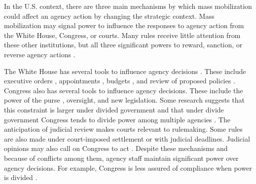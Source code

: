 In the U.S. context, there are three main mechanisms by which mass mobilization could affect an agency action by changing the strategic context. 
Mass mobilization may signal power to influence the responses to agency action from the White House, Congress, or courts. Many rules receive little attention from these other institutions, but all three significant powers to reward, sanction, or reverse agency actions \citep{Yaver2016}. 

% 


The White House has several tools to influence agency decisions \citep{Yackee2009a,Simon1954}. These include executive orders \citep{Mayer1999}, appointments \citep{Doherty2014,Lewis2008,Wood1988}, budgets \citep{Whittington2003}, and review of proposed policies \citep{HAEDER2015InfluenceBudget,Acs2013}. 
Congress also has several tools to influence agency decisions. These include the power of the purse \citep{Fenno1986,Bolton2015}, oversight, and new legislation. Some research suggests that this constraint is larger under divided government \citep{Yackee2009b} and that under divide government Congress tends to divide power among multiple agencies \citep{Farhang2016}.
The anticipation of judicial review makes courts relevant to rulemaking. Some rules are also made under court-imposed settlement or with judicial deadlines. Judicial opinions may also call on Congress to act \citep{Yaver2017}.
Despite these mechanisms and because of conflicts among them, agency staff maintain significant power over agency decisions. For example, Congress is less assured of compliance when power is divided \citep{Yaver2016}.


